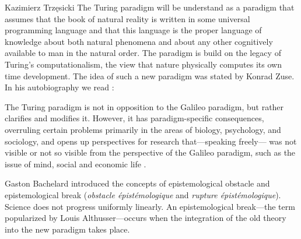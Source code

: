 \begin{artengenv}{Kazimierz Trzęsicki}
The Turing paradigm will be understand as a paradigm that assumes that the book of natural reality is written in some universal programming language  and that this language is the proper language of knowledge about both natural phenomena and about any other cognitively available to man in the natural order. The paradigm is build on the legacy of Turing's computationalism, the view that nature physically computes its own time development. The idea of such a new paradigm was stated by Konrad Zuse. In his autobiography we read \parencite[p.63--64]{Zuse2012a}: 


The Turing paradigm is not in opposition to the Galileo paradigm, but rather clarifies and modifies it. However, it has paradigm-specific consequences, overruling certain problems primarily in the areas of biology, psychology, and sociology, and opens up perspectives for research that---speaking freely--- was not visible or not so visible from the perspective of the Galileo paradigm, such as the issue of mind, social and economic life \parencite[chapter 20]{MarciszewskiStacewicz2011}.


Gaston Bachelard \parencite*{Bachelard2002}  introduced the concepts of epistemological obstacle and epistemological break (\textit{obstacle épistémologique} and \textit{rupture épistémologique}). Science does not progress uniformly linearly. An epistemological break---the term popularized by Louis Althusser---occurs when the integration of the old theory into the new paradigm takes place.


\end{artengenv}

